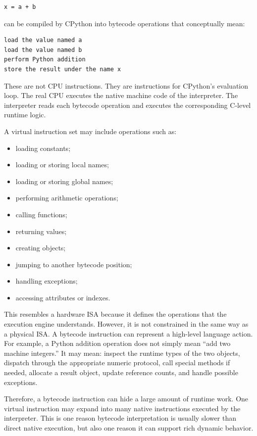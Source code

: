 \documentclass[a4paper,twoside]{report}
\begin{document}
\begin{verbatim}
x = a + b
\end{verbatim}

can be compiled by CPython into bytecode operations that conceptually mean:

\begin{verbatim}
load the value named a
load the value named b
perform Python addition
store the result under the name x
\end{verbatim}

These are not CPU instructions. They are instructions for CPython's evaluation loop. The real CPU executes the native machine code of the interpreter. The interpreter reads each bytecode operation and executes the corresponding C-level runtime logic.

A virtual instruction set may include operations such as:

\begin{itemize}
    \item loading constants;
    \item loading or storing local names;
    \item loading or storing global names;
    \item performing arithmetic operations;
    \item calling functions;
    \item returning values;
    \item creating objects;
    \item jumping to another bytecode position;
    \item handling exceptions;
    \item accessing attributes or indexes.
\end{itemize}

This resembles a hardware ISA because it defines the operations that the execution engine understands. However, it is not constrained in the same way as a physical ISA. A bytecode instruction can represent a high-level language action. For example, a Python addition operation does not simply mean ``add two machine integers.'' It may mean: inspect the runtime types of the two objects, dispatch through the appropriate numeric protocol, call special methods if needed, allocate a result object, update reference counts, and handle possible exceptions.

Therefore, a bytecode instruction can hide a large amount of runtime work. One virtual instruction may expand into many native instructions executed by the interpreter. This is one reason bytecode interpretation is usually slower than direct native execution, but also one reason it can support rich dynamic behavior.
\end{document}
